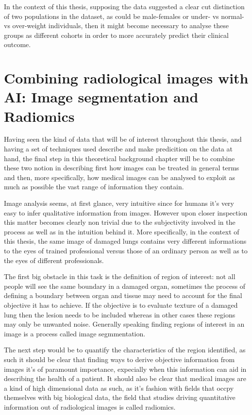 In the context of this thesis, supposing the data suggested a clear cut distinction of two populations in the dataset, as could be male-females or under- vs  normal- vs over-weight individuals, then it might become necessary to analyse these groups as different  cohorts in order to more accurately predict their clinical outcome.


\section{Combining radiological images  with AI: Image segmentation and Radiomics}
Having seen the kind of data that will be of interest throughout this thesis, and having a set of techniques used describe and make predicition on the data at hand, the final step in this theoretical background chapter will be to combine these two notion in describing first how images can be treated in general terms and then, more specifically, how medical images can be analysed to exploit as much as possible the vast range of information they contain.

Image analysis seems, at first glance, very intuitive since for humans it's very easy to infer qualitative information from images. However upon closer inspection this matter becomes clearly non trivial due to the subjectivity involved in the process as well as in the intuition behind it. More specifically, in the context of this thesis, the same image of damaged lungs contains very different informations to the eyes of trained professional versus those of an ordinary person as well as to the eyes of different professionals.

The first big obstacle in this task is the definition of region of interest: not all people will see the same boundary in a damaged organ, sometimes the process of defining a boundary between organ and tissue may need to account for the final objective it has to achieve. If the objective is to evaluate texture of a damaged lung then the lesion needs to be included whereas in other cases these regions may only be unwanted noise. Generally speaking finding regions of interest in an image is a process called image segmmentation.

The next step would be to quantify the characteristics of the region identified, as such it should be clear that finding ways to derive objective information from images it's of paramount importance, expecially when this information can aid in describing the health of a patient. It should also be clear that medical images are a kind of high dimensional data as such, as it's fashion with fields that occpy themselves with big biological data, the field that studies driving quantitative information out of radiological images is called radiomics.

